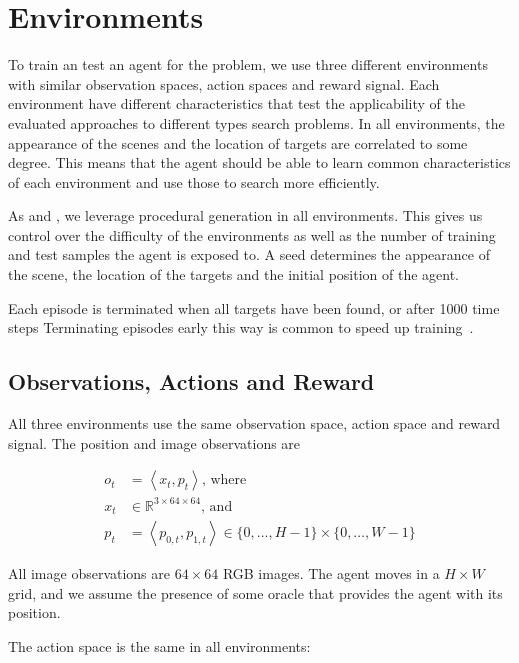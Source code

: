 \section{Environments}
\label{sec:environments}

To train an test an agent for the problem, we use three different environments with similar observation spaces, action spaces and reward signal.
Each environment have different characteristics that test the applicability of the evaluated approaches to different types search problems.
In all environments, the appearance of the scenes and the location of targets are correlated to some degree.
This means that the agent should be able to learn common characteristics of each environment and use those to search more efficiently.

As \cite{cobbe_procgen_2020} and \cite{mnih_asynchronous_2016}, we leverage procedural generation in all environments.
This gives us control over the difficulty of the environments as well as the number of training and test samples the agent is exposed to.
A seed determines the appearance of the scene, the location of the targets and the initial position of the agent.

Each episode is terminated when all targets have been found, or after 1000 time steps
Terminating episodes early this way is common to speed up training~\cite{pardo_timelimits_2022}.

\subsection{Observations, Actions and Reward}

All three environments use the same observation space, action space and reward signal.
The position and image observations are

\begin{align}
    o_t & = \left\langle x_t, p_t \right\rangle \text{, where} \\
    x_t & \in \mathbb{R}^{3 \times 64 \times 64} \text{, and} \\
    p_t & = \left\langle p_{0,t}, p_{1,t} \right\rangle \in \{0, \dots, H-1\} \times \{0, \dots, W-1\}
\end{align}

All image observations are \(64 \times 64\) RGB images.
The agent moves in a \(H \times W\) grid, and we assume the presence of some oracle that provides the agent with its position.

The action space is the same in all environments:

